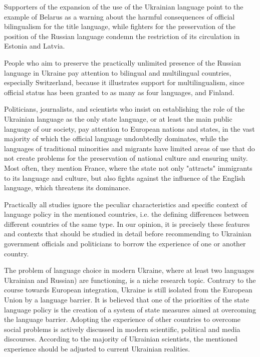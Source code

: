 \documentclass[english]{textolivre}
\begin{document}
Supporters of the expansion of the use of the Ukrainian language point to the example of Belarus as a warning about the harmful consequences of official bilingualism for the title language, while fighters for the preservation of the position of the Russian language condemn the restriction of its circulation in Estonia and Latvia.

People who aim to preserve the practically unlimited presence of the Russian language in Ukraine pay attention to bilingual and multilingual countries, especially Switzerland, because it illustrates support for multilingualism, since official status has been granted to as many as four languages, and Finland.

Politicians, journalists, and scientists who insist on establishing the role of the Ukrainian language as the only state language, or at least the main public language of our society, pay attention to European nations and states, in the vast majority of which the official language undoubtedly dominates, while the languages of traditional minorities and migrants have limited areas of use that do not create problems for the preservation of national culture and ensuring unity. Most often, they mention France, where the state not only "attracts" immigrants to its language and culture, but also fights against the influence of the English language, which threatens its dominance.

Practically all studies ignore the peculiar characteristics and specific context of language policy in the mentioned countries, i.e. the defining differences between different countries of the same type. In our opinion, it is precisely these features and contexts that should be studied in detail before recommending to Ukrainian government officials and politicians to borrow the experience of one or another country.

The problem of language choice in modern Ukraine, where at least two languages Ukrainian and Russian) are functioning, is a niche research topic. Contrary to the course towards European integration, Ukraine is still isolated from the European Union by a language barrier. It is believed that one of the priorities of the state language policy is the creation of a system of state measures aimed at overcoming the language barrier. Adopting the experience of other countries to overcome social problems is actively discussed in modern scientific, political and media discourses. According to the majority of Ukrainian scientists, the mentioned experience should be adjusted to current Ukrainian realities.
\end{document}
